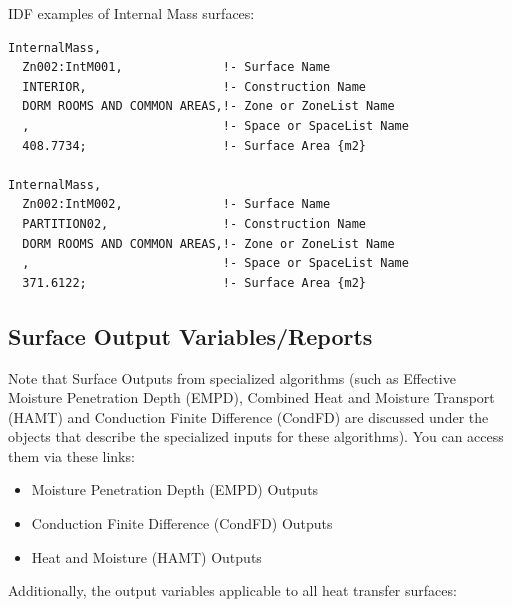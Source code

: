 IDF examples of Internal Mass surfaces:

\begin{lstlisting}
InternalMass,
  Zn002:IntM001,              !- Surface Name
  INTERIOR,                   !- Construction Name
  DORM ROOMS AND COMMON AREAS,!- Zone or ZoneList Name
  ,                           !- Space or SpaceList Name
  408.7734;                   !- Surface Area {m2}

InternalMass,
  Zn002:IntM002,              !- Surface Name
  PARTITION02,                !- Construction Name
  DORM ROOMS AND COMMON AREAS,!- Zone or ZoneList Name
  ,                           !- Space or SpaceList Name
  371.6122;                   !- Surface Area {m2}
\end{lstlisting}

\subsection{Surface Output Variables/Reports}\label{surface-output-variablesreports}

Note that Surface Outputs from specialized algorithms (such as Effective Moisture Penetration Depth (EMPD), Combined Heat and Moisture Transport (HAMT) and Conduction Finite Difference (CondFD) are discussed under the objects that describe the specialized inputs for these algorithms). You can access them via these links:

\begin{itemize}
\tightlist
\item
  Moisture Penetration Depth (EMPD) Outputs
\item
  Conduction Finite Difference (CondFD) Outputs
\item
  Heat and Moisture (HAMT) Outputs
\end{itemize}

Additionally, the output variables applicable to all heat transfer surfaces:

